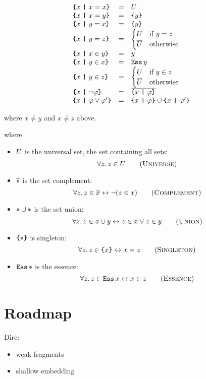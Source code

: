 \documentclass[sigplan,10pt,anonymous,review]{acmart}\settopmatter{printfolios=true,printccs=false,printacmref=false}
\begin{document}
\[\begin{array}{lcll}
  \text{\texttt{\{}} x ~\text{\texttt{|}}~ x = x \text{\texttt{\}}} & = & U \\
  \text{\texttt{\{}} x ~\text{\texttt{|}}~ x = y \text{\texttt{\}}} & = & \text{\texttt{\{}} y \text{\texttt{\}}} \\
  \text{\texttt{\{}} x ~\text{\texttt{|}}~ y = x \text{\texttt{\}}} & = & \text{\texttt{\{}} y \text{\texttt{\}}} \\
  \text{\texttt{\{}} x ~\text{\texttt{|}}~ y = z \text{\texttt{\}}} & = &
    \begin{cases}
      U & \text{if } y = z\\
      \overline{U} & \text{otherwise}
    \end{cases}\\
  \text{\texttt{\{}} x ~\text{\texttt{|}}~ x \in y \text{\texttt{\}}} & = & y \\
  \text{\texttt{\{}} x ~\text{\texttt{|}}~ y \in x \text{\texttt{\}}} & = & \text{\texttt{Ess}}\,y \\
  \text{\texttt{\{}} x ~\text{\texttt{|}}~ y \in z \text{\texttt{\}}} & = &
    \begin{cases}
      U & \text{if } y \in z\\
      \overline{U} & \text{otherwise}
    \end{cases}\\
  \text{\texttt{\{}} x ~\text{\texttt{|}}~ \neg\varphi \text{\texttt{\}}} & = & \overline{\text{\texttt{\{}} x ~\text{\texttt{|}}~ \varphi \text{\texttt{\}}}} \\
  \text{\texttt{\{}} x ~\text{\texttt{|}}~ \varphi \lor \varphi' \text{\texttt{\}}} & = & \text{\texttt{\{}} x ~\text{\texttt{|}}~ \varphi \text{\texttt{\}}} \cup \text{\texttt{\{}} x ~\text{\texttt{|}}~ \varphi' \text{\texttt{\}}} \\
\end{array}\]

where $x\neq y$ and $x \neq z$ above.

where
\begin{itemize} \renewcommand\labelitemi{--}
  \item $U$ is the universal set, \ie{} the set containing all sets:
    \[ \forall z.\, z \in \Universe \sctag{Universe} \]
  \item $\Complement \Placeholder$ is the set complement:
    \[ \forall z.\, z \in \Complement x \leftrightarrow \neg (z \in x) \sctag{Complement}\]
  \item $\Union \Placeholder \Placeholder$ is the set union:
    \[ \forall z.\, z \in \Union x y \leftrightarrow z \in x \lor z \in y \sctag{Union} \]
  \item $\Sing\Placeholder$ is singleton:
    \[ \forall z.\, z \in \Sing x \leftrightarrow x = z \sctag{Singleton} \]
  \item $\Essence\Placeholder$ is the essence:
    \[ \forall z.\, z \in \Essence{x} \leftrightarrow x \in z \sctag{Essence} \]
\end{itemize}

\section{Roadmap}
Dire:
\begin{itemize}
  \item 
  weak fragments
  \item shallow embedding
\end{itemize}
\end{document}
